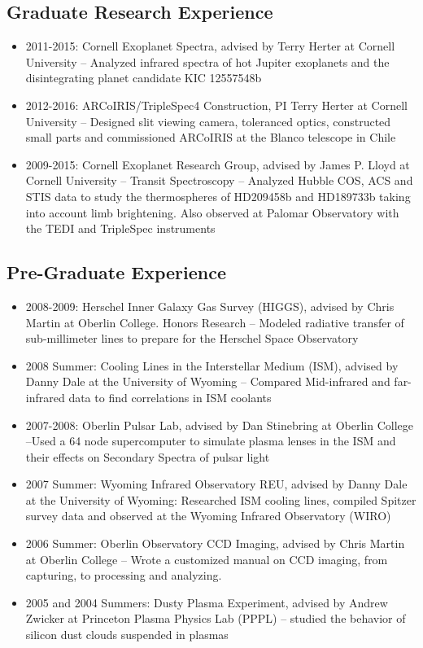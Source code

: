 \documentclass[11pt, oneside]{article}   	%
\begin{document}
\subsection*{Graduate Research Experience}
\begin{itemize}[noitemsep]
	\item 2011-2015: Cornell Exoplanet Spectra, advised by Terry Herter at Cornell University -- Analyzed infrared spectra of hot Jupiter exoplanets and the disintegrating planet candidate KIC 12557548b
	\item 2012-2016: ARCoIRIS/TripleSpec4 Construction, PI Terry Herter at Cornell University -- Designed slit viewing camera, toleranced optics, constructed small parts and commissioned ARCoIRIS at the Blanco telescope in Chile
	\item 2009-2015: Cornell Exoplanet Research Group, advised by James P. Lloyd at Cornell University -- Transit Spectroscopy -- Analyzed Hubble COS, ACS and STIS data to study the thermospheres of HD209458b and HD189733b taking into account limb brightening. Also observed at Palomar Observatory with the TEDI and TripleSpec instruments
\end{itemize}

\subsection*{Pre-Graduate Experience}
\begin{itemize}[noitemsep]
	\item 2008-2009: Herschel Inner Galaxy Gas Survey (HIGGS), advised by Chris Martin at Oberlin College. Honors Research -- Modeled radiative transfer of sub-millimeter lines to prepare for the Herschel Space Observatory
	\item 2008 Summer: Cooling Lines in the Interstellar Medium (ISM), advised by Danny Dale at the University of Wyoming -- Compared Mid-infrared and far-infrared data to find correlations in ISM coolants
	\item 2007-2008: Oberlin Pulsar Lab, advised by Dan Stinebring at Oberlin College --Used a 64 node supercomputer to simulate plasma lenses in the ISM and their effects on Secondary Spectra of pulsar light
	\item 2007 Summer: Wyoming Infrared Observatory REU, advised by Danny Dale at the University of Wyoming: Researched ISM cooling lines, compiled Spitzer survey data and observed at the Wyoming Infrared Observatory (WIRO)
	\item 2006 Summer: Oberlin Observatory CCD Imaging, advised by Chris Martin at Oberlin College -- Wrote a customized manual on CCD imaging, from capturing, to processing and analyzing.
	\item 2005 and 2004 Summers: Dusty Plasma Experiment, advised by Andrew Zwicker at Princeton Plasma Physics Lab (PPPL) -- studied the behavior of silicon dust clouds suspended in plasmas
\end{itemize}
\end{document}
